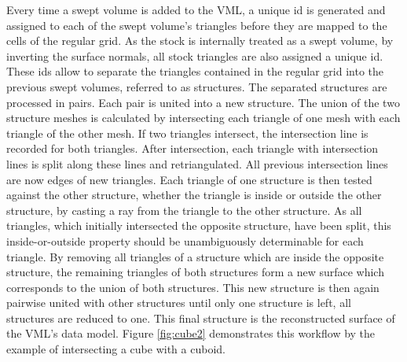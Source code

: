 Every time a swept volume is added to the VML, a unique id is generated and assigned to each of the swept volume's triangles before they are mapped to the cells of the regular grid.
As the stock is internally treated as a swept volume, by inverting the surface normals, all stock triangles are also assigned a unique id.
These ids allow to separate the triangles contained in the regular grid into the previous swept volumes, referred to as structures.
The separated structures are processed in pairs.
Each pair is united into a new structure.
The union of the two structure meshes is calculated by intersecting each triangle of one mesh with each triangle of the other mesh.
If two triangles intersect, the intersection line is recorded for both triangles.
After intersection, each triangle with intersection lines is split along these lines and retriangulated.
All previous intersection lines are now edges of new triangles.
Each triangle of one structure is then tested against the other structure, whether the triangle is inside or outside the other structure, \eg by casting a ray from the triangle to the other structure.
As all triangles, which initially intersected the opposite structure, have been split, this inside-or-outside property should be unambiguously determinable for each triangle.
By removing all triangles of a structure which are inside the opposite structure, the remaining triangles of both structures form a new surface which corresponds to the union of both structures.
This new structure is then again pairwise united with other structures until only one structure is left, \ie all structures are reduced to one.
This final structure is the reconstructed surface of the VML's data model.
Figure \ref{fig:cube2} demonstrates this workflow by the example of intersecting a cube with a cuboid.

